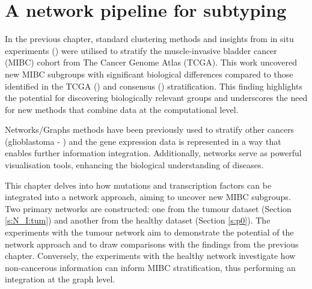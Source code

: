 \chapter{A network pipeline for subtyping} \label{s:N_I}


\vspace{3mm}
\vspace{3mm}



In the previous chapter, standard clustering methods and insights from in situ experiments (\citet{Baker2022-bj}) were utilised to stratify the muscle-invasive bladder cancer (MIBC) cohort from The Cancer Genome Atlas (TCGA). This work uncovered new MIBC subgroups with significant biological differences compared to those identified in the TCGA (\citet{Robertson2017-mg}) and consensus (\citet{Kamoun2020-tj}) stratification. This finding highlights the potential for discovering biologically relevant groups and underscores the need for new methods that combine data at the computational level.

Networks/Graphs methods have been previously used to stratify other cancers (glioblastoma - \citet{Care2019-ij}) and the gene expression data is represented in a way that enables further information integration. Additionally, networks serve as powerful visualisation tools, enhancing the biological understanding of diseases.

This chapter delves into how mutations and transcription factors can be integrated into a network approach, aiming to uncover new MIBC subgroups. Two primary networks are constructed: one from the tumour dataset (Section \ref{s:N_I:tum}) and another from the healthy dataset (Section \ref{s:p0}). The experiments with the tumour network aim to demonstrate the potential of the network approach and to draw comparisons with the findings from the previous chapter. Conversely, the experiments with the healthy network investigate how non-cancerous information can inform MIBC stratification, thus performing an integration at the graph level.

